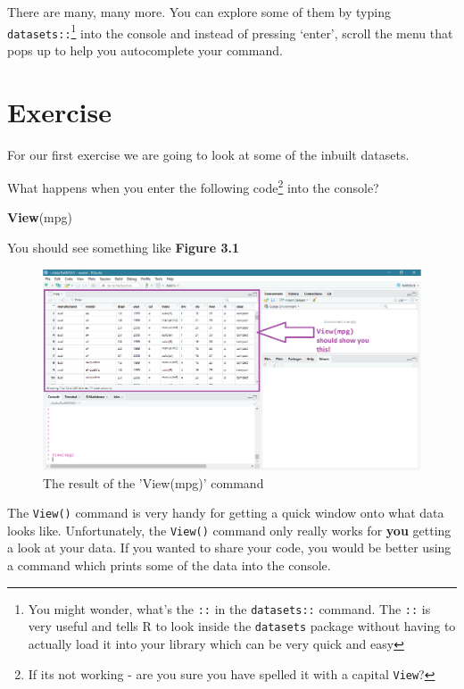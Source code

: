 \documentclass[
]{book}
\newenvironment{Shaded}{\begin{snugshade}}{\end{snugshade}}
\newcommand{\KeywordTok}[1]{\textcolor[rgb]{0.13,0.29,0.53}{\textbf{#1}}}
\newcommand{\NormalTok}[1]{#1}
\begin{document}
There are many, many more. You can explore some of them by typing \texttt{datasets::}\footnote{You might wonder, what's the \texttt{::} in the \texttt{datasets::} command. The \texttt{::} is very useful and tells R to look inside the \texttt{datasets} package without having to actually load it into your library which can be very quick and easy} into the console and instead of pressing `enter', scroll the menu that pops up to help you autocomplete your command.

\hypertarget{ex_inbuiltdata}{%
\section{Exercise}\label{ex_inbuiltdata}}

For our first exercise we are going to look at some of the inbuilt datasets.

What happens when you enter the following code\footnote{If its not working - are you sure you have spelled it with a capital \texttt{View}?} into the console?

\begin{Shaded}
\begin{Highlighting}[]
\KeywordTok{View}\NormalTok{(mpg)}
\end{Highlighting}
\end{Shaded}

You should see something like \textbf{Figure 3.1}

\begin{figure}

{\centering \includegraphics{images/03_data/rstud01} 

}

\caption{The result of the 'View(mpg)' command}\label{fig:unnamed-chunk-31}
\end{figure}

The \texttt{View()} command is very handy for getting a quick window onto what data looks like. Unfortunately, the \texttt{View()} command only really works for \textbf{you} getting a look at your data. If you wanted to share your code, you would be better using a command which prints some of the data into the console.
\end{document}
